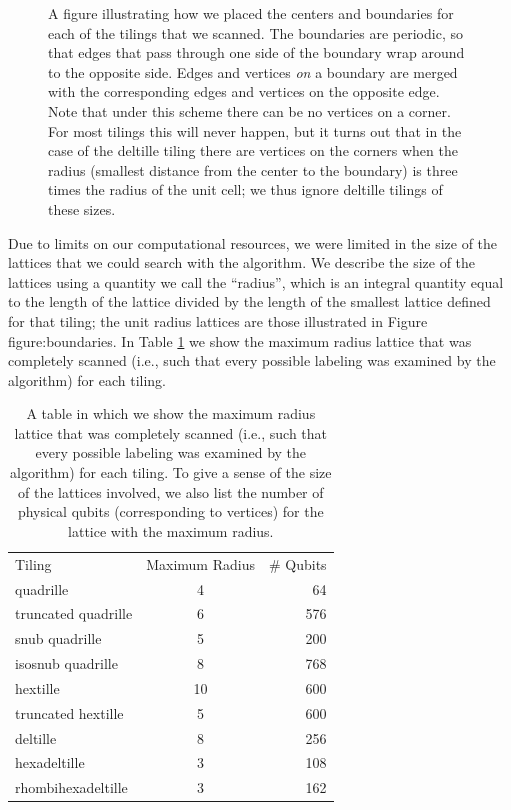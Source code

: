 \documentclass[twocolumn,showpacs,preprintnumbers,amsmath,amssymb,nofootinbib,pra,floatfix]{revtex4-1}
\begin{document}
\begin{figure}
\caption{
\label{figure:boundaries}
A figure illustrating how we placed the centers and boundaries for each of the tilings that we scanned.  The boundaries are periodic, so that edges that pass through one side of the boundary wrap around to the opposite side.  Edges and vertices \emph{on} a boundary are merged with the corresponding edges and vertices on the opposite edge.
Note that under this scheme there can be no vertices on a corner.  For most tilings this will never happen, but it turns out that in the case of the deltille tiling there are vertices on the corners when the radius (smallest distance from the center to the boundary) is three times the radius of the unit cell;  we thus ignore deltille tilings of these sizes.
}
\end{figure}

Due to limits on our computational resources, we were limited in the size of the lattices that we could search with the algorithm.  We describe the size of the lattices using a quantity we call the ``radius'', which is an integral quantity equal to the length of the lattice divided by the length of the smallest lattice defined for that tiling;  the unit radius lattices are those illustrated in Figure {figure:boundaries}.  In Table \ref{table:maximum-radius-scanned} we show the maximum radius lattice that was completely scanned (i.e., such that every possible labeling was examined by the algorithm) for each tiling.

\begin{table}
\begin{tabular}{lcr}
Tiling & Maximum Radius & \# Qubits\\
quadrille & 4 & 64\\
truncated quadrille & 6 & 576\\
snub quadrille & 5 & 200\\
isosnub quadrille & 8 & 768\\
hextille & 10 & 600\\
truncated hextille & 5 & 600\\
deltille & 8 & 256\\
hexadeltille & 3 & 108\\
rhombihexadeltille & 3 & 162\\
\end{tabular}
\caption[Lattice sizes scanned for each tiling]{
\label{table:maximum-radius-scanned}
A table in which we show the maximum radius lattice that was completely scanned (i.e., such that every possible labeling was examined by the algorithm) for each tiling.  To give a sense of the size of the lattices involved, we also list the number of physical qubits (corresponding to vertices) for the lattice with the maximum radius.
}
\end{table}
\end{document}
